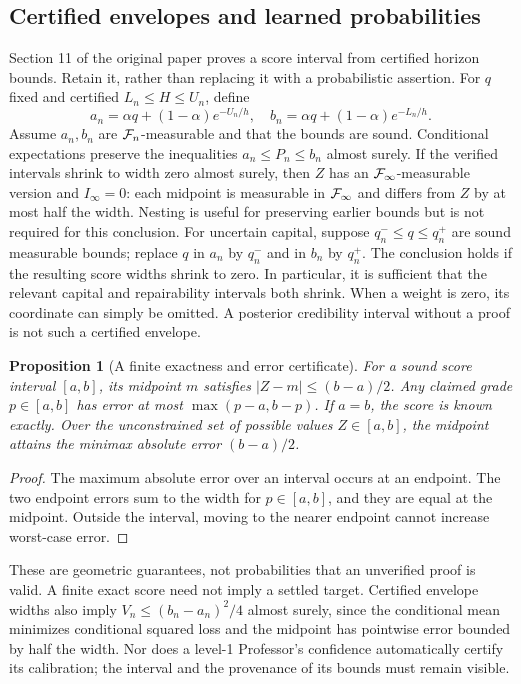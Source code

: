 \documentclass[11pt,letterpaper]{article}
\newtheorem{proposition}[theorem]{Proposition}
\theoremstyle{definition}\newtheorem{definition}[theorem]{Definition}\newtheorem{example}[theorem]{Example}\newtheorem{conjecture}[theorem]{Conjecture}
\begin{document}
\subsection{Certified envelopes and learned probabilities}
Section 11 of the original paper proves a score interval from certified horizon bounds. Retain it, rather than replacing it with a probabilistic assertion. For $q$ fixed and certified $L_n\leq H\leq U_n$, define
\[
 a_n=\alpha q+(1-\alpha)e^{-U_n/h},\quad b_n=\alpha q+(1-\alpha)e^{-L_n/h}.
\]
Assume $a_n,b_n$ are $\mathcal F_n$-measurable and that the bounds are sound. Conditional expectations preserve the inequalities $a_n\leq P_n\leq b_n$ almost surely. If the verified intervals shrink to width zero almost surely, then $Z$ has an $\mathcal F_\infty$-measurable version and $I_\infty=0$: each midpoint is measurable in $\mathcal F_\infty$ and differs from $Z$ by at most half the width. Nesting is useful for preserving earlier bounds but is not required for this conclusion. For uncertain capital, suppose $q^-_n\leq q\leq q^+_n$ are sound measurable bounds; replace $q$ in $a_n$ by $q^-_n$ and in $b_n$ by $q^+_n$. The conclusion holds if the resulting score widths shrink to zero. In particular, it is sufficient that the relevant capital and repairability intervals both shrink. When a weight is zero, its coordinate can simply be omitted. A posterior credibility interval without a proof is not such a certified envelope.
\begin{proposition}[A finite exactness and error certificate]
For a sound score interval $[a,b]$, its midpoint $m$ satisfies $|Z-m|\leq(b-a)/2$. Any claimed grade $p\in[a,b]$ has error at most $\max(p-a,b-p)$. If $a=b$, the score is known exactly. Over the unconstrained set of possible values $Z\in[a,b]$, the midpoint attains the minimax absolute error $(b-a)/2$.
\end{proposition}
\begin{proof}The maximum absolute error over an interval occurs at an endpoint. The two endpoint errors sum to the width for $p\in[a,b]$, and they are equal at the midpoint. Outside the interval, moving to the nearer endpoint cannot increase worst-case error.\end{proof}
These are geometric guarantees, not probabilities that an unverified proof is valid. A finite exact score need not imply a settled target. Certified envelope widths also imply $V_n\leq (b_n-a_n)^2/4$ almost surely, since the conditional mean minimizes conditional squared loss and the midpoint has pointwise error bounded by half the width. Nor does a level-1 Professor's confidence automatically certify its calibration; the interval and the provenance of its bounds must remain visible.
\end{document}

